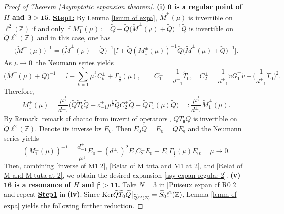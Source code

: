 \documentclass[reqno, 11pt]{amsart}
\newcommand\Z{\mathbb{Z}}
\numberwithin{equation}{section}
\begin{document}
\begin{proof}[Proof of Theorem {\rm\ref{Asymptotic expansion theorem}}]{\bf{(i) ${\bm{0}}$ is a regular point of $H$ and {$\bm{\beta>15}$}.}}
{\bf{\underline{Step1:}}} By Lemma \ref{lemm of expa}, $\widetilde{M}^{\pm}(\mu)$ is invertible on $\ell^{2}(\Z)$ if and only if $ M^{\pm}_1(\mu):=\widetilde{Q}-\widetilde{Q}\big(\widetilde{M}^{\pm}(\mu)+\widetilde{Q}\big)^{-1}\widetilde{Q}$ is invertible on $\widetilde{Q}\ell^{2}(\Z)$ and in this case, one has
\begin{align}\label{Relat of M tuta and M1 at 2}
\big(\widetilde{M}^{\pm}(\mu)\big)^{-1}=\big(\widetilde{M}^{\pm}(\mu)+\widetilde{Q}\big)^{-1}\Big[I+\widetilde{Q}\left(M^{\pm}_1(\mu)\right)^{-1}\widetilde{Q}\big(\widetilde{M}^{\pm}(\mu)+\widetilde{Q}\big)^{-1}\Big].
\end{align}
As $\mu\rightarrow0$, the Neumann series yields
\begin{equation}\label{expr of Ckpm}
\big(\widetilde{M}^{\pm}(\mu)+\widetilde{Q}\big)^{-1}=I-\sum\limits_{k=1}^{2}\mu^{\frac{k}{2}}C^{\pm}_{k}+\Gamma_{\frac{3}{2}}(\mu),\qquad C^{\pm}_{1}=\frac{1}{d^{\pm}_{-1}}\widetilde{T}_0,\quad C^{\pm}_{2}=\frac{1}{d^{\pm}_{-1}}\tilde{v}\widetilde{G}^{\pm}_1\tilde{v}-\Big(\frac{1}{d^{\pm}_{-1}}\widetilde{T}_0\Big)^2.
\end{equation}
Therefore,
\begin{equation}\label{Relat of M1 and M1 tuta at 2}
M^{\pm}_1(\mu)=\frac{\mu^{\frac{1}{2}}}{d^{\pm}_{-1}}\Big(\widetilde{Q}\widetilde{T}_0\widetilde{Q}+d^{\pm}_{-1}\mu^{\frac{1}{2}}\widetilde{Q}C^{\pm}_{2}\widetilde{Q}+\widetilde{Q}\Gamma_{1}(\mu)\widetilde{Q}\Big)=:\frac{\mu^{\frac{1}{2}}}{d^{\pm}_{-1}}\widetilde{M}^{\pm}_1(\mu).
\end{equation}
By Remark \ref{remark of charac from inverti of operators}, $\widetilde{Q}\widetilde{T}_0\widetilde{Q}$ is invertible on $\widetilde{Q}\ell^{2}(\Z)$. Denote its inverse by $E_0$. Then  $E_0\widetilde{Q}=E_0=\widetilde{Q}E_0$ and the Neumann series yields
\begin{equation}\label{inverse of M1 2}
\left( M^{\pm}_1(\mu)\right)^{-1}=\frac{d^{\pm}_{-1}}{\mu^{\frac{1}{2}}}E_0-\left(d^{\pm}_{-1}\right)^2E_0C^{\pm}_2E_0+E_0\Gamma_{\frac{1}{2}}(\mu)E_0,\quad\mu\rightarrow0.
\end{equation}
Then, combining \eqref{inverse of M1 2}, \eqref{Relat of M tuta and M1 at 2}, and \eqref{Relat of M and M tuta at 2}, we obtain the desired expansion \eqref{asy expan regular 2}.
\vskip0.1cm
{\bf{(v) ${\bm{16}}$ is a resonance of $H$ and {$\bm{\beta>11}$}.}} Take $N=3$ in \eqref{Puiseux expan of R0 2} and repeat {\bf{\underline{Step1}}} in {\bf{(iv)}}. Since ${\rm Ker}\widetilde{Q}\widetilde{T}_0\widetilde{Q}\big|_{\widetilde{Q}\ell^2(\Z)}=\widetilde{S}_0\ell^2(\Z)$, Lemma \ref{lemm of expa} yields the following further reduction.

\end{proof}
\end{document}
